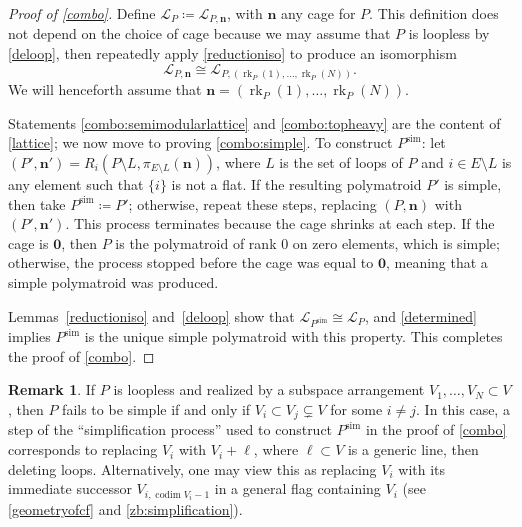 \documentclass[11pt]{article}
\theoremstyle{definition}
\newtheorem{rema}[theo]{Remark}
\numberwithin{equation}{section}
\newcommand{\simp}{\mathrm{sim}}
\DeclareMathOperator{\rk}{rk}
\DeclareMathOperator{\codim}{codim}
\begin{document}
\begin{proof}[Proof of \cref{combo}]
  Define $\mathcal L_P \coloneqq \mathcal L_{P, \mathbf n}$, with $\mathbf n$ any cage for $P$.
  This definition does not depend on the choice of cage because we may assume that $P$ is loopless by \cref{deloop}, then repeatedly apply \cref{reductioniso} to produce an isomorphism 
  \[
  \mathcal L_{P, \mathbf n} \cong \mathcal L_{P, (\rk_P(1), \ldots, \rk_P(N))}.
  \]
  We will henceforth assume that $\mathbf n = (\rk_P(1), \ldots, \rk_P(N))$.

  Statements \cref{combo:semimodularlattice} and \cref{combo:topheavy} are the content of \cref{lattice}; we now move to proving \cref{combo:simple}.
  To construct $P^\simp$: let $(P', \mathbf n') = R_i(P \setminus L, \pi_{E \setminus L}(\mathbf n))$, where $L$ is the set of loops of $P$ and $i \in E \setminus L$ is any element such that $\{i\}$ is not a flat.
  If the resulting polymatroid $P'$ is simple, then take $P^\simp \coloneqq P'$; otherwise, repeat these steps, replacing $(P,\mathbf n)$ with $(P', \mathbf n')$.
  This process terminates because the cage shrinks at each step.
  If the cage is $\mathbf 0$, then $P$ is the polymatroid of rank 0 on zero elements, which is simple; otherwise, the process stopped before the cage was equal to $\mathbf 0$, meaning that a simple polymatroid was produced.

  Lemmas~\ref{reductioniso} and~\ref{deloop} show that $\mathcal L_{P^\simp} \cong \mathcal L_P$, and \cref{determined} implies $P^\simp$ is the unique simple polymatroid with this property.
 This completes the proof of \cref{combo}.
\end{proof}
\begin{rema}\label{rmk:realizingreduction}
  If $P$ is loopless and realized by a subspace arrangement $V_1, \ldots, V_N \subset V$, then
  $P$ fails to be simple if and only if $V_i \subset V_j \subsetneq V$  for some $i \neq j$.
  In this case, a step of the ``simplification process'' used to construct $P^\simp$ in the proof of \cref{combo} corresponds to replacing  $V_i$ with $V_i + \ell$, where $\ell \subset V$ is a generic line, then deleting loops.
  Alternatively, one may view this as replacing $V_i$ with its immediate successor $V_{i,\codim V_i - 1}$ in a general flag containing $V_i$ (see \cref{geometryofcf} and \cref{zb:simplification}).
\end{rema}
\end{document}

